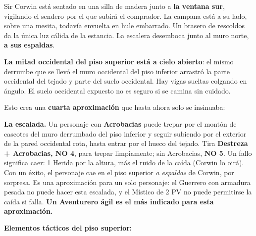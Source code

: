 \documentclass[10pt,a4paper]{article}
\begin{document}
Sir Corwin está sentado en una silla de madera junto a \textbf{la ventana sur}, vigilando el sendero por el que subirá el comprador. La campana está a su lado, sobre una mesita, todavía envuelta en hule embarrado. Un brasero de rescoldos da la única luz cálida de la estancia. La escalera desemboca junto al muro norte, \textbf{a sus espaldas}.

\textbf{La mitad occidental del piso superior está a cielo abierto}: el mismo derrumbe que se llevó el muro occidental del piso inferior arrastró la parte occidental del tejado y parte del suelo occidental. Hay vigas sueltas colgando en ángulo. El suelo occidental expuesto no es seguro si se camina sin cuidado.

Esto crea una \textbf{cuarta aproximación} que hasta ahora solo se insinuaba:

\textbf{La escalada.} Un personaje con \textbf{Acrobacias} puede trepar por el montón de cascotes del muro derrumbado del piso inferior y seguir subiendo por el exterior de la pared occidental rota, hasta entrar por el hueco del tejado. Tira \textbf{Destreza + Acrobacias, NO 4}, para trepar limpiamente; sin Acrobacias, \textbf{NO 5}. Un fallo significa caer: 1 Herida por la altura, más el ruido de la caída (Corwin lo oirá). Con un éxito, el personaje cae en el piso superior \emph{a espaldas} de Corwin, por sorpresa. Es una aproximación para un solo personaje: el Guerrero con armadura pesada no puede hacer esta escalada, y el Místico de 2 PV no puede permitirse la caída si falla. \textbf{Un Aventurero ágil es el más indicado para esta aproximación.}

\par{}\noindent\textbf{Elementos tácticos del piso superior:}
\end{document}
